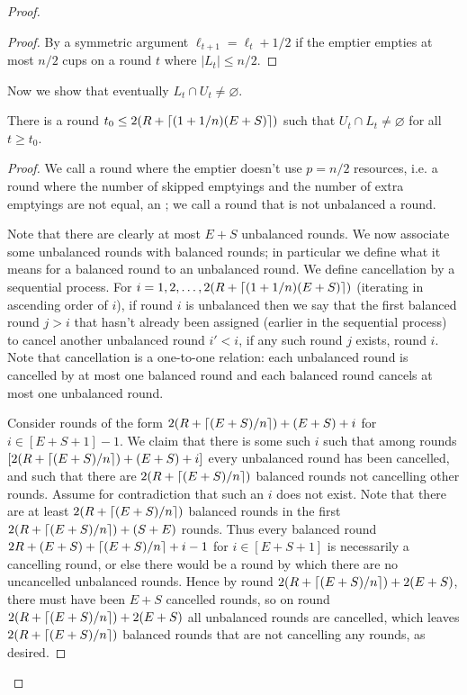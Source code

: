 \begin{proof}
\begin{proof}
    By a symmetric argument $\ell_{t+1} = \ell_{t} + 1/2$ if the
    emptier empties at most $n/2$ cups on a round $t$ where
    $|L_t| \le n/2$. 
  \end{proof}

  Now we show that eventually $L_t \cap U_t \neq \varnothing$.
  \begin{clm}
    There is a round $t_0 \le 2(R + \left\lceil (1+1/n)(E + S) \right\rceil)$ such that $U_{t}
    \cap L_{t} \neq \varnothing$ for all $t\ge t_0$.
  \end{clm}
  \begin{proof}
  We call a round where the emptier doesn't use $p=n/2$
  resources, i.e. a round where the number of skipped emptyings
  and the number of extra emptyings are not equal, an
  ; we call a round that is not unbalanced a
   round. 

  Note that there are clearly at most $E+S$ unbalanced rounds.
  We now associate some unbalanced rounds with balanced rounds;
  in particular we define what it means for a balanced round to
   an unbalanced round. We define cancellation by a
  sequential process. For $i = 1,2,\ldots,
  2(R+\left\lceil (1+1/n)(E+S) \right\rceil)$ (iterating in ascending order of $i$), if round $i$
  is unbalanced then we say that the first balanced round $j > i$
  that hasn't already been assigned (earlier in the sequential
  process) to cancel another unbalanced round $i' < i$, if any
  such round $j$ exists,  round $i$. Note that
  cancellation is a one-to-one relation: each unbalanced round is
  cancelled by at most one balanced round and each balanced round
  cancels at most one unbalanced round.

  Consider rounds of the form $2(R + \left\lceil (E+S)/n \right\rceil) + (E+S) + i$
  for $i \in [E+S+1]-1$. We claim that there is some such $i$
  such that among rounds $[2(R + \left\lceil (E+S)/n \right\rceil) + (E+S) + i]$
  every unbalanced round has been cancelled, and such that there
  are $2(R+\left\lceil (E+S)/n \right\rceil)$ balanced rounds not cancelling other
  rounds. Assume for contradiction that such an $i$ does not
  exist. Note that there are at least $2(R + \left\lceil (E+S)/n \right\rceil)$
  balanced rounds in the first $2(R + \left\lceil (E+S)/n \right\rceil) + (S+E)$
  rounds. Thus every balanced round $2R+(E+S)+\left\lceil (E+S)/n \right\rceil +
  i-1$ for $i \in [E+S+1]$ is necessarily a cancelling round, or
  else there would be a round by which there are no uncancelled
  unbalanced rounds. Hence by round $2(R + \left\lceil (E+S)/n \right\rceil) + 2(E +
  S)$, there must have been $E+S$ cancelled rounds, so on round
  $2(R + \left\lceil (E+S)/n \right\rceil) + 2(E+S)$ all unbalanced rounds are
  cancelled, which leaves $2(R + \left\lceil (E+S)/n \right\rceil)$ balanced rounds
  that are not cancelling any rounds, as desired.


\end{proof}
\end{proof}
